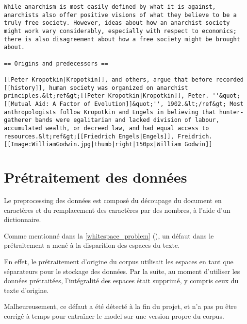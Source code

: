 \begin{lstlisting}[caption={Extrait des premières lignes du fichier enwik8},label=enwik8_ex]
While anarchism is most easily defined by what it is against, anarchists also offer positive visions of what they believe to be a truly free society. However, ideas about how an anarchist society might work vary considerably, especially with respect to economics; there is also disagreement about how a free society might be brought about. 

== Origins and predecessors ==

[[Peter Kropotkin|Kropotkin]], and others, argue that before recorded [[history]], human society was organized on anarchist principles.&lt;ref&gt;[[Peter Kropotkin|Kropotkin]], Peter. ''&quot;[[Mutual Aid: A Factor of Evolution]]&quot;'', 1902.&lt;/ref&gt; Most anthropologists follow Kropotkin and Engels in believing that hunter-gatherer bands were egalitarian and lacked division of labour, accumulated wealth, or decreed law, and had equal access to resources.&lt;ref&gt;[[Friedrich Engels|Engels]], Freidrich.
[[Image:WilliamGodwin.jpg|thumb|right|150px|William Godwin]]
\end{lstlisting}

\section{Prétraitement des données}
Le \gls{preprocessing} des données est composé du découpage du document en caractères et du remplacement des caractères par des nombres, à l'aide d'un dictionnaire.

Comme mentionné dans la \autoref{whitespace_problem} (), un défaut dans le prétraitement a mené à la disparition des espaces du texte.

En effet, le prétraitement d'origine du corpus utilisait les espaces en tant que séparateurs pour le stockage des données. Par la suite, au moment d'utiliser les données prétraitées, l'intégralité des espaces était supprimé, y compris ceux du texte d'origine.

Malheureusement, ce défaut a été détecté à la fin du projet, et n'a pas pu être corrigé à temps pour entraîner le \gls{model} sur une version propre du \gls{corpus}.
